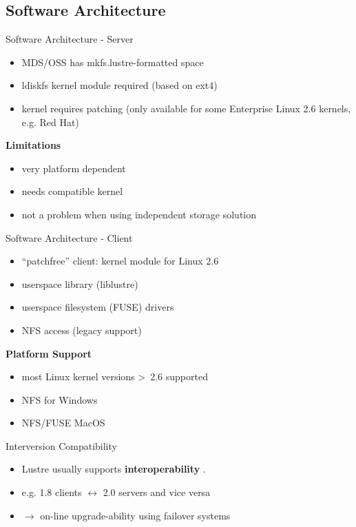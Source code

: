 \subsection{Software Architecture}

\begin{frame}{Software Architecture - Server}
    \begin{itemize}
        \item MDS/OSS has mkfs.lustre-formatted space
        \item ldiskfs kernel module required (based on ext4)
        \item kernel requires patching (only available for some Enterprise Linux 2.6 kernels, e.g. Red Hat)
    \end{itemize}

    \textbf{Limitations}

    \begin{itemize}
        \item very platform dependent
        \item needs compatible kernel
        \item not a problem when using independent storage solution
    \end{itemize}
\end{frame}

\begin{frame}{Software Architecture - Client}
    \begin{itemize}
        \item ``patchfree'' client: kernel module for Linux 2.6
        \item userspace library (liblustre)
        \item userspace filesystem (FUSE) drivers
        \item NFS access (legacy support)
    \end{itemize}

    \textbf{Platform Support}
    \begin{itemize}
        \item most Linux kernel versions \textgreater~2.6 supported
        \item NFS for Windows
        \item NFS/FUSE MacOS
    \end{itemize}
\end{frame}

\begin{frame}{Interversion Compatibility}
    \begin{itemize}
        \item Lustre usually supports \textbf{interoperability} \cite{interoperability}.
        \item e.g. 1.8 clients $\leftrightarrow$ 2.0 servers and vice versa
        \item $\rightarrow$ on-line upgrade-ability using failover systems
    \end{itemize}
\end{frame}

